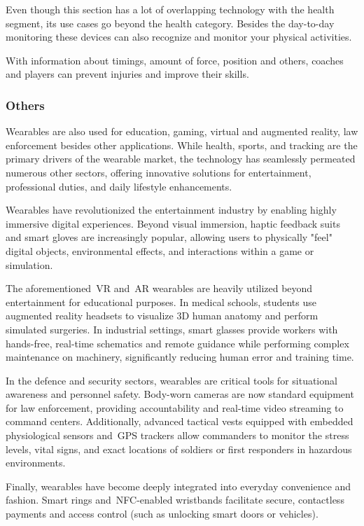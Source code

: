 Even though this section has a lot of overlapping technology with the health segment, its use cases go beyond the health category. Besides the day-to-day monitoring these devices can also recognize and monitor your physical activities.

With information about timings, amount of force, position and others, coaches and players can prevent injuries and improve their skills.

\subsubsection{Others}
\label{ssub:others}

Wearables are also used for education, gaming, virtual and augmented reality, law enforcement besides other applications.
While health, sports, and tracking are the primary drivers of the wearable market, the technology has seamlessly permeated numerous other sectors, offering innovative solutions for entertainment, professional duties, 
and daily lifestyle enhancements.

Wearables have revolutionized the entertainment industry by enabling highly immersive digital experiences. Beyond visual immersion, haptic feedback suits and smart gloves are increasingly popular, allowing users to 
physically "feel" digital objects, environmental effects, and interactions within a game or simulation.

The aforementioned~\gls{VR} and~\gls{AR} wearables are heavily utilized beyond entertainment for educational purposes. In medical schools, students use augmented reality headsets to visualize 3D human anatomy and perform simulated 
surgeries. In industrial settings, smart glasses provide workers with hands-free, real-time schematics and remote guidance while performing complex maintenance on machinery, significantly reducing human error and 
training time.

In the defence and security sectors, wearables are critical tools for situational awareness and personnel safety. Body-worn cameras are now standard equipment for law enforcement, providing accountability and real-time 
video streaming to command centers. Additionally, advanced tactical vests equipped with embedded physiological sensors and~\gls{GPS} trackers allow commanders to monitor the stress levels, vital signs, and exact locations 
of soldiers or first responders in hazardous environments.

Finally, wearables have become deeply integrated into everyday convenience and fashion. Smart rings and~\gls{NFC}-enabled wristbands facilitate secure, contactless payments and access control (such as unlocking smart doors 
or vehicles).

